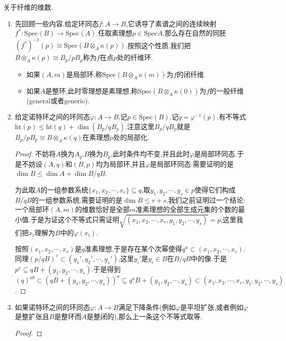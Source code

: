 关于纤维的维数.
\begin{enumerate}
	\item 先回顾一些内容.给定环同态$f:A\to B$,它诱导了素谱之间的连续映射$f^*:\mathrm{Spec}(B)\to\mathrm{Spec}(A)$.任取素理想$p\in\mathrm{Spec}A$,那么存在自然的同胚$(f^*)^{-1}(p)\cong\mathrm{Spec}(B\otimes_A\kappa(p))$.按照这个性质,我们把$B\otimes_A\kappa(p)\cong B_p/pB_p$称为$f$在点$p$处的纤维环.
	\begin{itemize}
		\item 如果$(A,m)$是局部环,称$\mathrm{Spec}(B\otimes_A\kappa(m))$为$f$的闭纤维.
		\item 如果$A$是整环,此时零理想是素理想,称$\mathrm{Spec}(B\otimes_A\kappa(0))$为$f$的一般纤维(general或者generic).
	\end{itemize}
    \item 给定诺特环之间的环同态$\varphi:A\to B$,记$p\in\mathrm{Spec}(B)$,记$q=\varphi^{-1}(p)$.有不等式$\mathrm{ht}(p)\le\mathrm{ht}(q)+\dim(B_p/qB_p)$.注意这里$B_p/qB_p$就是$B_p/pB_p\cong B\otimes_A\kappa(q)$在素理想$\overline{p}$处的局部化.
    \begin{proof}
    	
    	不妨将$A$换为$A_q$,$B$换为$B_p$,此时条件均不变,并且此时$\varphi$是局部环同态.于是不妨设$(A,q)$和$(B,p)$均为局部环,并且$\varphi$是局部环同态.需要证明的是$\dim B\le\dim A+\dim B/qB$.
    	
    	为此取$A$的一组参数系统$\{x_1,x_2,\cdots,x_r\}\subseteq q$,取$y_1,y_2,\cdots,y_s\in p$使得它们构成$B/qB$的一组参数系统.需要证明的是$\dim B\le r+s$.我们之前证明过一个结论:一个局部环$(A,m)$的维数恰好是全部$m$准素理想的全部生成元集的个数的最小值.于是为证这个不等式只需证明$\sqrt{(x_1,x_2,\cdots,x_r,y_1,y_2,\cdots,y_s)}=p$,这里我们把$x_i$理解为$B$中的$\varphi(x_i)$.
    	
    	\qquad
    	
    	按照$(x_1,x_2,\cdots,x_r)$是$q$准素理想,于是存在某个次幂使得$q^u\subset(x_1,x_2,\cdots,x_r)$.同理$(p/qB)^v\subset(y_1',y_2',\cdots,y_s')$,这里$y_i'$是$y_i\in B$在$B/qB$中的像.于是$p^v\subseteq qB+(y_1,y_2,\cdots,y_s)$.于是得到$(q)^{ab}\subset(qB+(y_1,y_2,\cdots,y_s))^a\subseteq q^aB+(y_1,y_2,\cdots,y_s)\subset(x_1,x_2,\cdots,x_r,y_1,y_2,\cdots,y_s)$.
    \end{proof}
    \item 如果诺特环之间的环同态$\varphi:A\to B$满足下降条件(例如$\varphi$是平坦扩张,或者例如$\varphi$是整扩张且$B$是整环而$A$是整闭的),那么上一条这个不等式取等.
    \begin{proof}
    	

\end{proof}
\end{enumerate}
